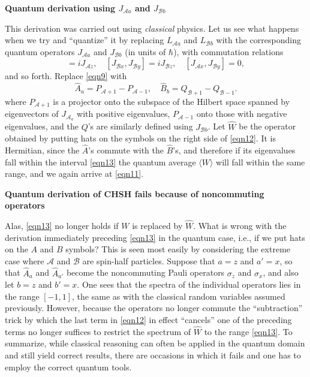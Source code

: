 \documentclass[12pt]{article} %
\def\outl#1{\par{\medskip\noindent\hspace*{.5cm}\bf
      \mathversion{bold}#1\mathversion{normal}\smallskip} }
\def\np{} \def\xa{} \def\xb{} \def\xn{} \def\xp{}
\def\outl#1{} \def\np{} \def\xa{} \def\xb{} \def\xn{} \def\xp{}
\def\outl#1{\par{\medskip\noindent\hspace*{.5cm}\bf
      \mathversion{bold}#1\mathversion{normal}\smallskip} }
\def\np{\newpage }\def\xn{\nopagebreak }\def\xp{\pagebreak }
\newcommand{\avg}[1]{\langle #1\rangle }
\newcommand{\AM}{{\mathcal A}}
\newcommand{\BM}{{\mathcal B}}
\newcommand{\sg}{\sigma }
\begin{document}
\xb
\outl{Quantum derivation using $J_{\AM a}$ and $J_{\BM b}$}
\xa


This derivation was carried out using \emph{classical} physics. Let us see
what happens when we try and ``quantize'' it by replacing $L_{\AM a}$ and
$L_{\BM b}$ with the corresponding quantum operators $J_{\AM a}$ and $J_{\BM
  b}$ (in units of $\hbar$), with commutation relations
\begin{equation}
  [J_{\AM x},J_{\AM y}] = i J_{\AM z}, \quad
  [J_{\BM x},J_{\BM y}] = i J_{\BM z}, \quad
  [J_{\AM x},J_{\BM y}] = 0,
\label{eqn14}
\end{equation}
and so forth. 
Replace \eqref{eqn9} with
\begin{equation}
 \hat  A_a = P_{\AM +1} - P_{\AM -1},\quad
 \hat B_b = Q_{\BM +1} - Q_{\BM -1}.
\label{eqn15}
\end{equation}
where $P_{\AM +1}$ is a projector onto the subspace of the
Hilbert space spanned by eigenvectors of $J_{\AM_a}$ with positive eigenvalues, 
$P_{\AM -1}$ onto those with negative eigenvalues, and the $Q$'s are
similarly defined using $J_{\BM b}$. Let $\hat W$ be the operator obtained by
putting hats on the symbols on the right side of \eqref{eqn12}. It
is Hermitian, since the $\hat A$'s commute with the $\hat B$'s, and therefore
if its eigenvalues fall within the interval \eqref{eqn13} the quantum average
$\avg{W}$ will fall within the same range, and we again arrive at 
\eqref{eqn11}.  

\xb
\outl{Quantum derivation of CHSH fails because of noncommuting operators}
\xa


Alas, \eqref{eqn13} no longer holds if $W$ is replaced by $\hat W$.  What is
wrong with the derivation immediately preceding \eqref{eqn13} in the quantum
case, i.e., if we put hats on the $A$ and $B$ symbols?  This is seen most
easily by considering the extreme case where $\AM$ and $\BM$ are spin-half
particles.  Suppose that $a=z$ and $a'=x$, so that $\hat A_a$ and $\hat
A_{a'}$ become the noncommuting Pauli operators $\sg_z$ and $\sg_x$, and also
let $b=z$ and $b'=x$.  One sees that the spectra of the individual operators
lies in the range $[-1,1]$, the same as with the classical random variables
assumed previously.  However, because the operators no longer commute the
``subtraction'' trick by which the last term in \eqref{eqn12} in effect
``cancels'' one of the preceding terms no longer suffices to restrict the
spectrum of $\hat W$ to the range \eqref{eqn13}.  To summarize, while
classical reasoning can often be applied in the quantum domain and still yield
correct results, there are occasions in which it fails and one has to employ
the correct quantum tools.
\end{document}
